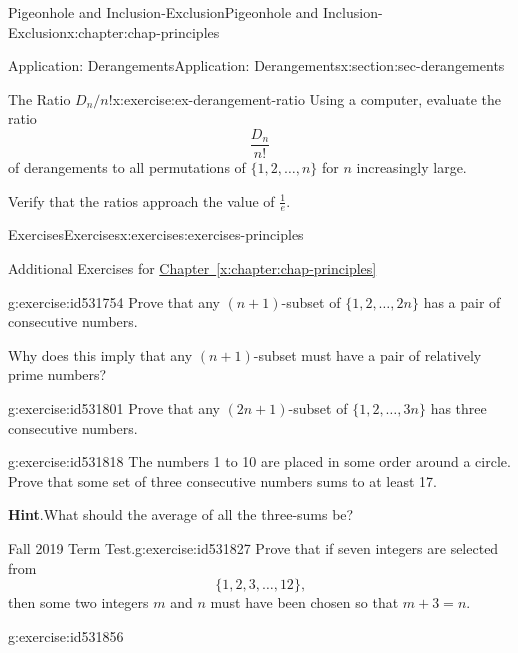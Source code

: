 \documentclass[oneside,10pt,]{book}
\newcommand{\blocktitlefont}{\relax}
\newcommand{\xreffont}{\relax}
\numberwithin{equation}{section}
\begin{document}
\begin{chapterptx}{Pigeonhole and Inclusion-Exclusion}{}{Pigeonhole and Inclusion-Exclusion}{}{}{x:chapter:chap-principles}
\begin{sectionptx}{Application: Derangements}{}{Application: Derangements}{}{}{x:section:sec-derangements}
\begin{inlineexercise}{The Ratio \(D_n/n!\)}{x:exercise:ex-derangement-ratio}
Using a computer, evaluate the ratio%
\begin{equation*}
\frac{D_n}{n!}
\end{equation*}
of derangements to all permutations of \(\{1,2,\ldots,n\}\) for \(n\) increasingly large.%
\par
Verify that the ratios approach the value of \(\frac{1}{e}\).%
\end{inlineexercise}%
\end{sectionptx}
%
%
\typeout{************************************************}
\typeout{************************************************}
%
\begin{exercises-section}{Exercises}{}{Exercises}{}{}{x:exercises:exercises-principles}
\begin{introduction}{}%
Additional Exercises for \hyperref[x:chapter:chap-principles]{Chapter~{\xreffont\ref{x:chapter:chap-principles}}}%
\end{introduction}%
\begin{divisionexercise}{1}{}{}{g:exercise:id531754}%
Prove that any \((n+1)\)-subset of \(\{1,2,\ldots,2n\}\) has a pair of consecutive numbers.%
\par
Why does this imply that any \((n+1)\)-subset must have a pair of relatively prime numbers?%
\end{divisionexercise}%
\begin{divisionexercise}{2}{}{}{g:exercise:id531801}%
Prove that any \((2n+1)\)-subset of \(\{1,2,\ldots,3n\}\) has three consecutive numbers.%
\end{divisionexercise}%
\begin{divisionexercise}{3}{}{}{g:exercise:id531818}%
The numbers 1 to 10 are placed in some order around a circle. Prove that some set of three consecutive numbers sums to at least 17.%
\par\smallskip%
\noindent\textbf{\blocktitlefont Hint}.\hypertarget{g:hint:id531830}{}\quad{}What should the average of all the three-sums be?%
\end{divisionexercise}%
\begin{divisionexercise}{4}{Fall 2019 Term Test.}{}{g:exercise:id531827}%
Prove that if seven integers are selected from%
\begin{equation*}
\{1,2,3,\ldots,12\}\text{,}
\end{equation*}
then some two integers \(m\) and \(n\) must have been chosen so that \(m + 3 = n\).%
\end{divisionexercise}%
\begin{divisionexercise}{5}{}{}{g:exercise:id531856}%

\end{divisionexercise}
\end{exercises-section}
\end{chapterptx}
\end{document}
